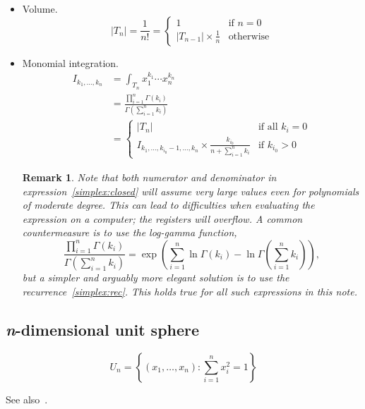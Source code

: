 \documentclass[final]{scrartcl}
\newtheorem*{remark}{Remark}
\begin{document}
\begin{itemize}
  \item Volume.
    \begin{equation}
      |T_n| = \frac{1}{n!} = \begin{cases}
        1&\text{if $n=0$}\\
        |T_{n-1}| \times \frac{1}{n}&\text{otherwise}
      \end{cases}
    \end{equation}
  \item Monomial integration.
  \begin{align}\nonumber
    I_{k_1,\dots,k_n}
    &= \int_{T_n} x_1^{k_1}\cdots x_n^{k_n}\\
    &= \frac{\prod_{i=1}^n\Gamma(k_i)}{\Gamma\left(\sum_{i=1}^n
    k_i\right)}\label{simplex:closed}\\
    &=\begin{cases}
      |T_n|&\text{if all $k_i=0$}\\
      I_{k_1,\dots,k_{i_0}-1,\dots,k_n} \times \frac{k_{i_0}}{n + \sum_{i=1}^n k_i}&\text{if $k_{i_0} > 0$}
    \end{cases}\label{simplex:rec}
  \end{align}
  \begin{remark}
  Note that both numerator and denominator in expression~\eqref{simplex:closed} will
    assume very large values even for polynomials of moderate degree. This can lead to
    difficulties when evaluating the expression on a computer; the registers will
    overflow. A common countermeasure is to use the log-gamma function,
    \[
    \frac{\prod_{i=1}^n\Gamma(k_i)}{\Gamma\left(\sum_{i=1}^n k_i\right)}
    = \exp\left(\sum_{i=1}^n\ln\Gamma(k_i) - \ln\Gamma\left(\sum_{i=1}^n
    k_i\right)\right),
    \]
    but a simpler and arguably more elegant solution is to use the
    recurrence~\eqref{simplex:rec}. This holds true for all such expressions in this
    note.
  \end{remark}

\end{itemize}

\subsection*{\textit{n}-dimensional unit sphere}
\[
  U_n = \left\{(x_1,\dots,x_n): \sum_{i=1}^n x_i^2 = 1\right\}
\]

See also~\cite{tau}.
\end{document}
